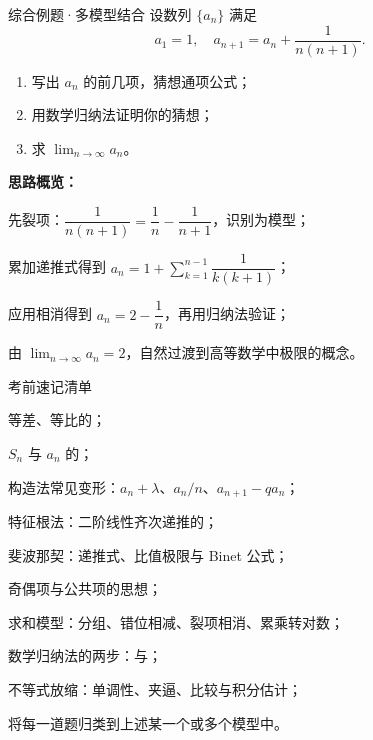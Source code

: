 \documentclass[a4paper,11pt]{ctexart}
\begin{document}
\begin{examplebox}{综合例题·多模型结合}
  设数列 $\{a_n\}$ 满足
  \[
    a_1=1,\quad a_{n+1}=a_n+\frac{1}{n(n+1)}.
  \]
  \begin{enumerate}
    \item 写出 $a_n$ 的前几项，猜想通项公式；
    \item 用数学归纳法证明你的猜想；
    \item 求 $\displaystyle\lim_{n\to\infty}a_n$。
  \end{enumerate}

  \textbf{思路概览：}
  \begin{focuspoints}
    \item 先裂项：$\dfrac{1}{n(n+1)}=\dfrac{1}{n}-\dfrac{1}{n+1}$，识别为模型；
    \item 累加递推式得到 $a_n=1+\sum_{k=1}^{n-1}\dfrac{1}{k(k+1)}$；
    \item 应用相消得到 $a_n=2-\dfrac{1}{n}$，再用归纳法验证；
    \item 由 $\displaystyle\lim_{n\to\infty}a_n=2$，自然过渡到高等数学中极限的概念。
  \end{focuspoints}
\end{examplebox}

\begin{NoteChecklist}{考前速记清单}
  \item 等差、等比的；
  \item $S_n$ 与 $a_n$ 的；
  \item 构造法常见变形：$a_n+\lambda$、$a_n/n$、$a_{n+1}-qa_n$；
  \item 特征根法：二阶线性齐次递推的；
  \item 斐波那契：递推式、比值极限与 Binet 公式；
  \item 奇偶项与公共项的思想；
  \item 求和模型：分组、错位相减、裂项相消、累乘转对数；
  \item 数学归纳法的两步：与；
  \item 不等式放缩：单调性、夹逼、比较与积分估计；
  \item 将每一道题归类到上述某一个或多个模型中。
\end{NoteChecklist}

\ifdefined\MathNoteBookMode\else
\end{document}
